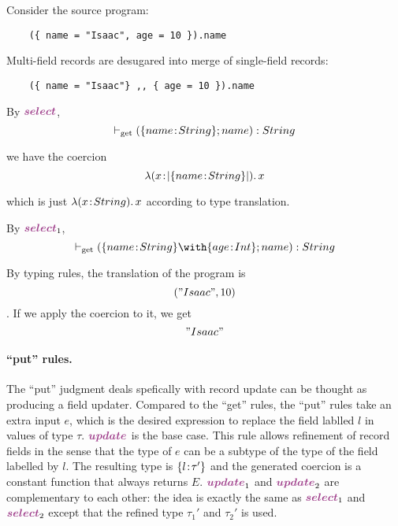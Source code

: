   Consider the source program:
  \begin{lstlisting}
    ({ name = "Isaac", age = 10 }).name
  \end{lstlisting}

  Multi-field records are desugared into merge of single-field records:
  \begin{lstlisting}
    ({ name = "Isaac"} ,, { age = 10 }).name
  \end{lstlisting}

  By $ \rulelabelselect $,
  \[ \vdash_{\textrm{get}} (\{ name \!:\! String \}; {name}) : String \]

  we have the coercion
  \[ \lambda (x \!:\! \lvert \{ name \!:\! String \} \rvert).\, x \]

  which is just $ \lambda (x \!:\! String).\, x $ according to type translation.

  By $ \rulelabelselectleft $,
  \[ \turnsget (\recty {name} {String} \andop \recty {age} {Int}; {name}) : String \]


  By typing rules, the translation of the program is
  \[ ("Isaac", 10) \]. If we apply the coercion to it, we get
  \[ "Isaac" \]


\paragraph{``put'' rules.}

  The ``put'' judgment deals spefically with record update can be thought as
  producing a field updater. Compared to the ``get'' rules, the ``put'' rules
  take an extra input $ e $, which is the desired expression to replace the
  field lablled $ l $ in values of type $ \tau $. $ \rulelabelupdate $ is the base
  case. This rule allows refinement of record fields in the sense that the type
  of $ e $ can be a subtype of the type of the field labelled by $ l $. The
  resulting type is $ \{ l \!:\! \tau' \} $ and the generated coercion is a
  constant function that always returns $ E $. $ \rulelabelupdateleft $ and
  $ \rulelabelupdateright $ are complementary to each other: the idea is exactly the
  same as $ \rulelabelselectleft $ and $ \rulelabelselectright $ except that the refined type
  $ \tau_1' $ and $ \tau_2' $ is used.

